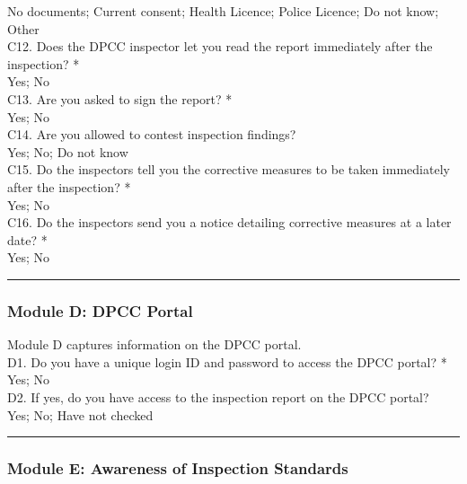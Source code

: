 \documentclass[a4paper, 12pt]{article}
\begin{document}
\begin{mdframed}[backgroundcolor=gray!20]
\begin{spacing}{0.5}
		No documents; Current consent; Health Licence; Police Licence; Do not know; Other \\
		
		{C12. Does the DPCC inspector let you read the report immediately after the inspection? *} \\
		
		Yes; No \\
		
		{C13. Are you asked to sign the report? *} \\
		
		Yes; No \\
		
		{C14. Are you allowed to contest inspection findings?} \\
		
		Yes; No; Do not know \\
		
		{C15. Do the inspectors tell you the corrective measures to be taken immediately after the inspection? *} \\
		
		Yes; No \\
		
		{C16. Do the inspectors send you a notice detailing corrective measures at a later date? *} \\
		
		Yes; No \\
		
		\hrule 
		
		\subsubsection*{Module D: DPCC Portal}
		
		Module D captures information on the DPCC portal. \\
		
		{D1. Do you have a unique login ID and password to access the DPCC portal? *} \\
		
		Yes; No \\
		
		{D2. If yes, do you have access to the inspection report on the DPCC portal?} \\
		
		Yes; No; Have not checked \\
		
		\hrule
		    		\subsubsection*{Module E: Awareness of Inspection Standards} 
		

\end{spacing}
\end{mdframed}
\end{document}
